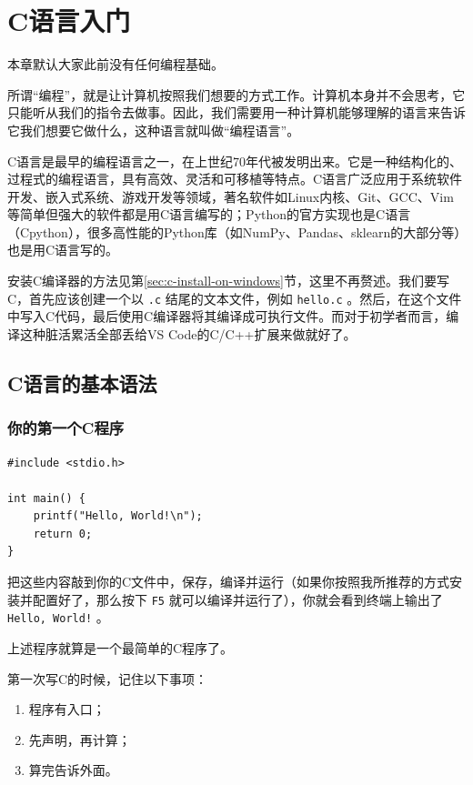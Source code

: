 \chapter{C语言入门}\label{chap:c-guidance}

本章默认大家此前没有任何编程基础。

所谓“编程”，就是让计算机按照我们想要的方式工作。计算机本身并不会思考，它只能听从我们的指令去做事。因此，我们需要用一种计算机能够理解的语言来告诉它我们想要它做什么，这种语言就叫做“编程语言”。

C语言是最早的编程语言之一，在上世纪70年代被发明出来。它是一种结构化的、过程式的编程语言，具有高效、灵活和可移植等特点。C语言广泛应用于系统软件开发、嵌入式系统、游戏开发等领域，著名软件如Linux内核、Git、GCC、Vim等简单但强大的软件都是用C语言编写的；Python的官方实现也是C语言（Cpython），很多高性能的Python库（如NumPy、Pandas、sklearn的大部分等）也是用C语言写的。

安装C编译器的方法见第\ref{sec:c-install-on-windows}节，这里不再赘述。我们要写C，首先应该创建一个以 \texttt{.c} 结尾的文本文件，例如 \texttt{hello.c} 。然后，在这个文件中写入C代码，最后使用C编译器将其编译成可执行文件。而对于初学者而言，编译这种脏活累活全部丢给VS Code的C/C++扩展来做就好了。

\section{C语言的基本语法}

\subsection{你的第一个C程序}
\begin{verbatim}
#include <stdio.h>

int main() {
    printf("Hello, World!\n");
    return 0;
}
\end{verbatim}

把这些内容敲到你的C文件中，保存，编译并运行（如果你按照我所推荐的方式安装并配置好了，那么按下 \texttt{F5} 就可以编译并运行了），你就会看到终端上输出了 \texttt{Hello, World!} 。

上述程序就算是一个最简单的C程序了。

第一次写C的时候，记住以下事项：

\begin{enumerate}
  \item 程序有入口；
  \item 先声明，再计算；
  \item 算完告诉外面。
\end{enumerate}

